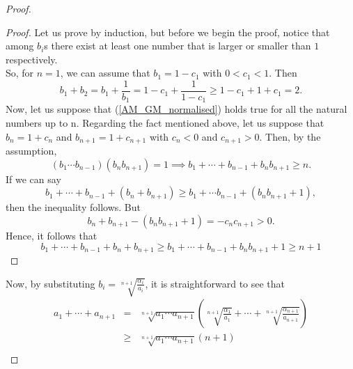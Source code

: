 \documentclass{article}
\begin{document}
\begin{proof}
\begin{proof}
 Let us prove by induction, but before we begin the proof, notice that among $b_i$s there exist at least one number that is larger or smaller than $1$ respectively. \\
So, for $n=1$, we can assume that $b_1 = 1-c_1$ with $0 < c_1 <1$. Then
\begin{equation*}
\label{ }
b_1 + b_2 = b_1 + \frac{1}{b_1} = 1 - c_1 + \frac{1}{1-c_1} \ge 1-c_1 + 1 + c_1 = 2.
\end{equation*}
Now, let us suppose that (\ref{AM_GM_normalised}) holds true for all the natural numbers up to n. Regarding the fact mentioned above, let us suppose that $b_n = 1 + c_n$ and $b_{n+1} = 1+c_{n+1}$ with $c_n < 0$ and $c_{n+1} > 0$. Then, by the assumption, 
\begin{equation*}
\label{ }
(b_1 \cdots b_{n-1})(b_n b_{n+1}) = 1 \implies b_1 + \cdots + b_{n-1} + b_n b_{n+1} \ge n.
\end{equation*}
If we can say
\begin{equation*}
\label{ }
b_1 + \cdots + b_{n-1} + (b_n + b_{n+1}) \ge b_1 + \cdots b_{n-1} + (b_n b_{n+1} + 1),
\end{equation*}
then the inequality follows. But
\begin{equation*}
\label{ }
b_n + b_{n+1} - (b_n b_{n+1} + 1) = -c_n c_{n+1} > 0.
\end{equation*}
Hence, it follows that 
\begin{equation*}
\label{ }
b_1 + \cdots + b_{n-1} + b_n + b_{n+1} \ge b_1 + \cdots + b_{n-1} + b_n b_{n+1} + 1 \ge n + 1
\end{equation*}
\end{proof}
Now, by substituting $b_i = \sqrt[n+1]{\frac{\alpha_i}{a_i}}$, it is straightforward to see that
\begin{eqnarray*}
a_1 + \cdots + a_{n+1} & = &  \sqrt[n+1]{a_1\cdots a_{n+1}} \left( \sqrt[n+1]{\frac{\alpha_1}{a_1}} + \cdots + \sqrt[n+1]{\frac{\alpha_{n+1}}{a_{n+1}}}\right) \nonumber \\
                                           & \ge &  \sqrt[n+1]{a_1\cdots a_{n+1}} (n + 1 ) \nonumber \\
\end{eqnarray*}
\end{proof}
\end{document}
